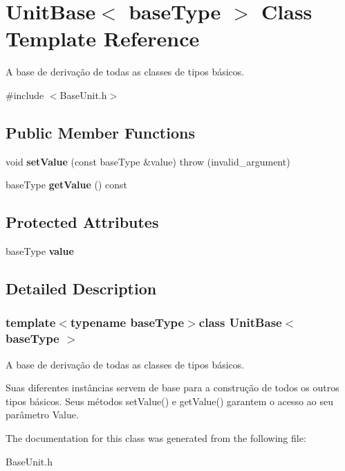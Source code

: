 \hypertarget{classUnitBase}{\section{Unit\-Base$<$ base\-Type $>$ Class Template Reference}
\label{classUnitBase}
}


A base de derivação de todas as classes de tipos básicos.  




{\ttfamily \#include $<$Base\-Unit.\-h$>$}

\subsection*{Public Member Functions}
\begin{DoxyCompactItemize}
\item 
\hypertarget{classUnitBase_af14e2453bc9870f0e04514799585e763}{void {\bfseries set\-Value} (const base\-Type \&value)  throw (invalid\-\_\-argument)}\label{classUnitBase_af14e2453bc9870f0e04514799585e763}

\item 
\hypertarget{classUnitBase_a6b4041c7176acb6c4956e085603449d1}{base\-Type {\bfseries get\-Value} () const }\label{classUnitBase_a6b4041c7176acb6c4956e085603449d1}

\end{DoxyCompactItemize}
\subsection*{Protected Attributes}
\begin{DoxyCompactItemize}
\item 
\hypertarget{classUnitBase_a1c1ad08b45f07a94e5cf71dee734436b}{base\-Type {\bfseries value}}\label{classUnitBase_a1c1ad08b45f07a94e5cf71dee734436b}

\end{DoxyCompactItemize}


\subsection{Detailed Description}
\subsubsection*{template$<$typename base\-Type$>$class Unit\-Base$<$ base\-Type $>$}

A base de derivação de todas as classes de tipos básicos. 

Suas diferentes instâncias servem de base para a construção de todos os outros tipos básicos. Seus métodos set\-Value() e get\-Value() garantem o acesso ao seu parâmetro Value. 

The documentation for this class was generated from the following file\-:\begin{DoxyCompactItemize}
\item 
Base\-Unit.\-h\end{DoxyCompactItemize}
